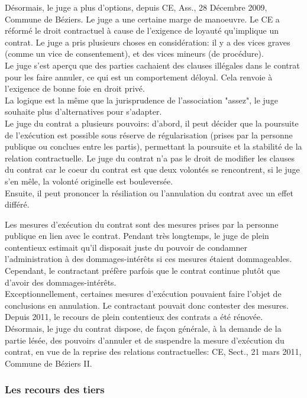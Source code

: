 \documentclass[10pt, a4paper, openany]{book}
\begin{document}
Désormais, le juge a plus d'options, depuis CE, Ass., 28 Décembre 2009, Commune de Béziers. Le juge a une certaine marge de manoeuvre. Le CE a réformé le droit contractuel à cause de l'exigence de loyauté qu'implique un contrat. Le juge a pris plusieurs choses en considération: il y a des vices graves (comme un vice de consentement), et des vices mineurs (de procédure). \\
Le juge s'est aperçu que des parties cachaient des clauses illégales dans le contrat pour les faire annuler, ce qui est un comportement déloyal. Cela renvoie à l'exigence de bonne foie en droit privé. \\
La logique est la même que la jurisprudence de l'association "assez", le juge souhaite plus d'alternatives pour s'adapter. \\
Le juge du contrat a plusieurs pouvoirs: d'abord, il peut décider que la poursuite de l'exécution est possible sous réserve de régularisation (prises par la personne publique ou conclues entre les partis), permettant la poursuite et la stabilité de la relation contractuelle. Le juge du contrat n'a pas le droit de modifier les clauses du contrat car le coeur du contrat est que deux volontés se rencontrent, si le juge s'en mêle, la volonté originelle est bouleversée. \\
Ensuite, il peut prononcer la résiliation ou l'annulation du contrat avec un effet différé. 


Les mesures d'exécution du contrat sont des mesures prises par la personne publique en lien avec le contrat. Pendant très longtemps, le juge de plein contentieux estimait qu'il disposait juste du pouvoir de condamner l'administration à des dommages-intérêts si ces mesures étaient dommageables. \\
Cependant, le contractant préfère parfois que le contrat continue plutôt que d'avoir des dommages-intérêts. \\
Exceptionnellement, certaines mesures d'exécution pouvaient faire l'objet de conclusions en annulation. Le contractant pouvait donc contester des mesures. \\
Depuis 2011, le recours de plein contentieux des contrats a été rénovée. Désormais, le juge du contrat dispose, de façon générale, à la demande de la partie lésée, des pouvoirs d'annuler et de suspendre la mesure d'exécution du contrat, en vue de la reprise des relations contractuelles: CE, Sect., 21 mars 2011, Commune de Béziers II. 

\subsubsection{Les recours des tiers}
\end{document}
